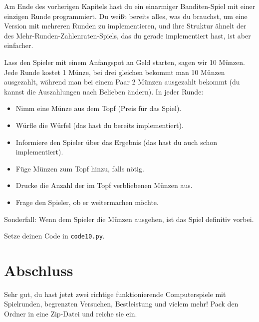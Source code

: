 \documentclass[
]{book}
\providecommand{\tightlist}{%
  \setlength{\itemsep}{0pt}\setlength{\parskip}{0pt}}
\begin{document}
Am Ende des vorherigen Kapitels hast du ein einarmiger Banditen-Spiel mit einer einzigen Runde programmiert. Du weißt bereits alles, was du brauchst, um eine Version mit mehreren Runden zu implementieren, und ihre Struktur ähnelt der des Mehr-Runden-Zahlenraten-Spiels, das du gerade implementiert hast, ist aber einfacher.

Lass den Spieler mit einem Anfangspot an Geld starten, sagen wir 10 Münzen. Jede Runde kostet 1 Münze, bei drei gleichen bekommt man 10 Münzen ausgezahlt, während man bei einem Paar 2 Münzen ausgezahlt bekommt (du kannst die Auszahlungen nach Belieben ändern). In jeder Runde:

\begin{itemize}
\tightlist
\item
  Nimm eine Münze aus dem Topf (Preis für das Spiel).
\item
  Würfle die Würfel (das hast du bereits implementiert).
\item
  Informiere den Spieler über das Ergebnis (das hast du auch schon implementiert).
\item
  Füge Münzen zum Topf hinzu, falls nötig.
\item
  Drucke die Anzahl der im Topf verbliebenen Münzen aus.
\item
  Frage den Spieler, ob er weitermachen möchte.
\end{itemize}

Sonderfall: Wenn dem Spieler die Münzen ausgehen, ist das Spiel definitiv vorbei.

Setze deinen Code in \texttt{code10.py}.

\hypertarget{abschluss}{%
\section{Abschluss}\label{abschluss}}

Sehr gut, du hast jetzt zwei richtige funktionierende Computerspiele mit Spielrunden, begrenzten Versuchen, Bestleistung und vielem mehr! Pack den Ordner in eine Zip-Datei und reiche sie ein.

  
\end{document}
